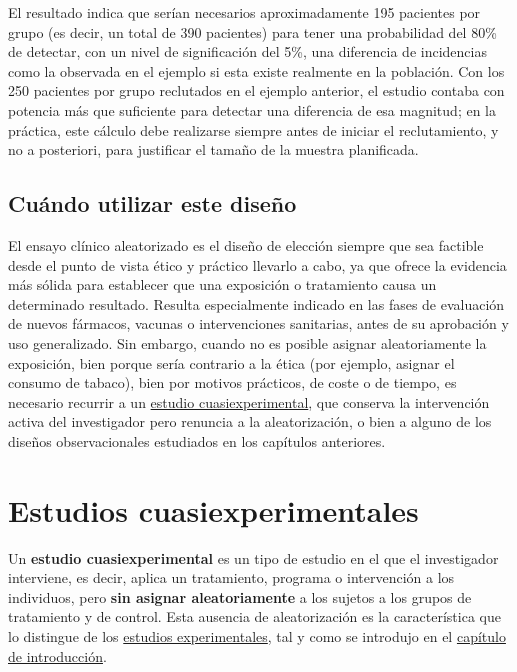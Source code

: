 \documentclass[
  spanish,
  a4paper,
]{scrreport}
\theoremstyle{definition}
\theoremstyle{definition}
\theoremstyle{remark}
\begin{document}
El resultado indica que serían necesarios aproximadamente 195 pacientes
por grupo (es decir, un total de 390 pacientes) para tener una
probabilidad del 80\% de detectar, con un nivel de significación del
5\%, una diferencia de incidencias como la observada en el ejemplo si
esta existe realmente en la población. Con los 250 pacientes por grupo
reclutados en el ejemplo anterior, el estudio contaba con potencia más
que suficiente para detectar una diferencia de esa magnitud; en la
práctica, este cálculo debe realizarse siempre antes de iniciar el
reclutamiento, y no a posteriori, para justificar el tamaño de la
muestra planificada.

\section{Cuándo utilizar este
diseño}\label{cuuxe1ndo-utilizar-este-diseuxf1o-5}

El ensayo clínico aleatorizado es el diseño de elección siempre que sea
factible desde el punto de vista ético y práctico llevarlo a cabo, ya
que ofrece la evidencia más sólida para establecer que una exposición o
tratamiento causa un determinado resultado. Resulta especialmente
indicado en las fases de evaluación de nuevos fármacos, vacunas o
intervenciones sanitarias, antes de su aprobación y uso generalizado.
Sin embargo, cuando no es posible asignar aleatoriamente la exposición,
bien porque sería contrario a la ética (por ejemplo, asignar el consumo
de tabaco), bien por motivos prácticos, de coste o de tiempo, es
necesario recurrir a un
\href{08-estudios-cuasiexperimentales.qmd}{estudio cuasiexperimental},
que conserva la intervención activa del investigador pero renuncia a la
aleatorización, o bien a alguno de los diseños observacionales
estudiados en los capítulos anteriores.

\chapter{Estudios
cuasiexperimentales}\label{estudios-cuasiexperimentales}

Un \textbf{estudio cuasiexperimental} es un tipo de estudio en el que el
investigador interviene, es decir, aplica un tratamiento, programa o
intervención a los individuos, pero \textbf{sin asignar aleatoriamente}
a los sujetos a los grupos de tratamiento y de control. Esta ausencia de
aleatorización es la característica que lo distingue de los
\hyperref[estudios-experimentales]{estudios experimentales}, tal y como
se introdujo en el
\hyperref[introducciuxf3n-a-los-tipos-de-estudios-estaduxedsticos]{capítulo
de introducción}.
\end{document}
